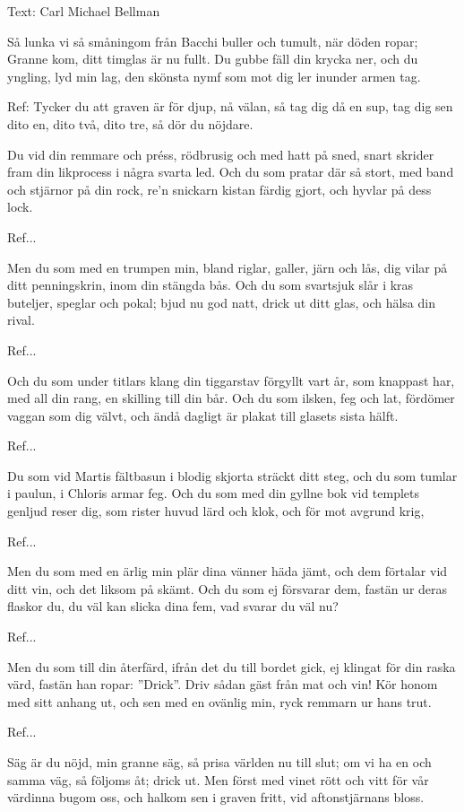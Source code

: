 Text:  Carl Michael Bellman\bigskip

Så lunka vi så småningom
från Bacchi buller och tumult,
när döden ropar; Granne kom,
ditt timglas är nu fullt.
Du gubbe fäll din krycka ner,
och du yngling, lyd min lag,
den skönsta nymf som mot dig ler
inunder armen tag. \bigskip

Ref:
Tycker du att graven är för djup,
nå välan, så tag dig då en sup,
tag dig sen dito en, dito två, dito tre,
så dör du nöjdare.\bigskip

Du vid din remmare och préss,
rödbrusig och med hatt på sned,
snart skrider fram din likprocess
i några svarta led.
Och du som pratar där så stort,
med band och stjärnor på din rock,
re’n snickarn kistan färdig gjort,
och hyvlar på dess lock. \bigskip

Ref...\bigskip

Men du som med en trumpen min,
bland riglar, galler, järn och lås,
dig vilar på ditt penningskrin,
inom din stängda bås.
Och du som svartsjuk slår i kras
buteljer, speglar och pokal;
bjud nu god natt, drick ut ditt glas,
och hälsa din rival.\bigskip

Ref...\bigskip

Och du som under titlars klang
din tiggarstav förgyllt vart år,
som knappast har, med all din rang,
en skilling till din bår.
Och du som ilsken, feg och lat,
fördömer vaggan som dig välvt,
och ändå dagligt är plakat
till glasets sista hälft. \bigskip

Ref...\bigskip

Du som vid Martis fältbasun
i blodig skjorta sträckt ditt steg,
och du som tumlar i paulun,
i Chloris armar feg.
Och du som med din gyllne bok
vid templets genljud reser dig,
som rister huvud lärd och klok,
och för mot avgrund krig,\bigskip

Ref...\bigskip

Men du som med en ärlig min
plär dina vänner häda jämt,
och dem förtalar vid ditt vin,
och det liksom på skämt.
Och du som ej försvarar dem,
fastän ur deras flaskor du,
du väl kan slicka dina fem,
vad svarar du väl nu?\bigskip

Ref...\bigskip

Men du som till din återfärd,
ifrån det du till bordet gick,
ej klingat för din raska värd,
fastän han ropar: ”Drick”.
Driv sådan gäst från mat och vin!
Kör honom med sitt anhang ut,
och sen med en ovänlig min,
ryck remmarn ur hans trut.\bigskip

Ref...\bigskip

Säg är du nöjd, min granne säg,
så prisa världen nu till slut;
om vi ha en och samma väg,
så följoms åt; drick ut.
Men först med vinet rött och vitt
för vår värdinna bugom oss,
och halkom sen i graven fritt,
vid aftonstjärnans bloss.\bigskip

